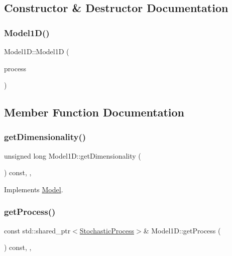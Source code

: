 \subsection{Constructor \& Destructor Documentation}
\hypertarget{class_model1_d_aca6508f11a4b419dacdc830afbe0af36}{}\label{class_model1_d_aca6508f11a4b419dacdc830afbe0af36} 
\subsubsection{\texorpdfstring{Model1\+D()}{Model1D()}}
{\footnotesize\ttfamily Model1\+D\+::\+Model1D (\begin{DoxyParamCaption}\item[{const std\+::shared\+\_\+ptr$<$ \hyperlink{class_stochastic_process}{Stochastic\+Process} $>$ \&}]{process }\end{DoxyParamCaption})\hspace{0.3cm}{\ttfamily [inline]}}



\subsection{Member Function Documentation}
\hypertarget{class_model1_d_ac81875523be6153cb58d0f37914eb9a1}{}\label{class_model1_d_ac81875523be6153cb58d0f37914eb9a1} 
\subsubsection{\texorpdfstring{get\+Dimensionality()}{getDimensionality()}}
{\footnotesize\ttfamily unsigned long Model1\+D\+::get\+Dimensionality (\begin{DoxyParamCaption}{ }\end{DoxyParamCaption}) const\hspace{0.3cm}{\ttfamily [inline]}, {\ttfamily [override]}, {\ttfamily [virtual]}}



Implements \hyperlink{class_model_acbe41cf30367bce4b96e92812d644f2d}{Model}.

\hypertarget{class_model1_d_ae3cdfcb2922f03a68b8e8e02d572746f}{}\label{class_model1_d_ae3cdfcb2922f03a68b8e8e02d572746f} 
\subsubsection{\texorpdfstring{get\+Process()}{getProcess()}\hspace{0.1cm}{\footnotesize\ttfamily [1/2]}}
{\footnotesize\ttfamily const std\+::shared\+\_\+ptr$<$\hyperlink{class_stochastic_process}{Stochastic\+Process}$>$\& Model1\+D\+::get\+Process (\begin{DoxyParamCaption}{ }\end{DoxyParamCaption}) const\hspace{0.3cm}{\ttfamily [inline]}, {\ttfamily [override]}, {\ttfamily [virtual]}}



